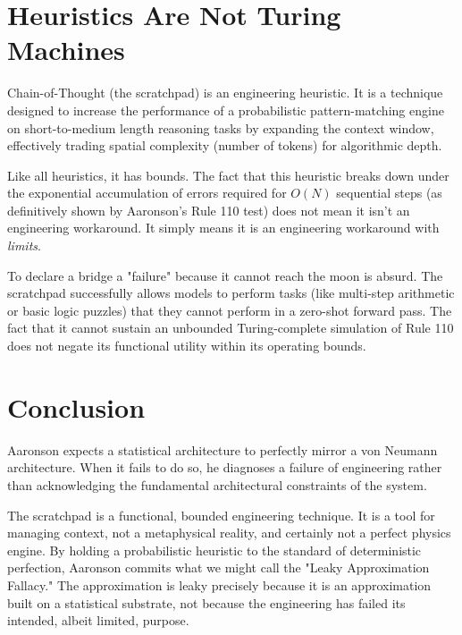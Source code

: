\documentclass[12pt,a4paper]{article}
\begin{document}
\section{Heuristics Are Not Turing Machines}

Chain-of-Thought (the scratchpad) is an engineering heuristic. It is a technique designed to increase the performance of a probabilistic pattern-matching engine on short-to-medium length reasoning tasks by expanding the context window, effectively trading spatial complexity (number of tokens) for algorithmic depth.

Like all heuristics, it has bounds. The fact that this heuristic breaks down under the exponential accumulation of errors required for $O(N)$ sequential steps (as definitively shown by Aaronson's Rule 110 test) does not mean it isn't an engineering workaround. It simply means it is an engineering workaround with \emph{limits}.

To declare a bridge a "failure" because it cannot reach the moon is absurd. The scratchpad successfully allows models to perform tasks (like multi-step arithmetic or basic logic puzzles) that they cannot perform in a zero-shot forward pass. The fact that it cannot sustain an unbounded Turing-complete simulation of Rule 110 does not negate its functional utility within its operating bounds.


\section{Conclusion}

Aaronson expects a statistical architecture to perfectly mirror a von Neumann architecture. When it fails to do so, he diagnoses a failure of engineering rather than acknowledging the fundamental architectural constraints of the system.

The scratchpad is a functional, bounded engineering technique. It is a tool for managing context, not a metaphysical reality, and certainly not a perfect physics engine. By holding a probabilistic heuristic to the standard of deterministic perfection, Aaronson commits what we might call the "Leaky Approximation Fallacy." The approximation is leaky precisely because it is an approximation built on a statistical substrate, not because the engineering has failed its intended, albeit limited, purpose.
\end{document}
